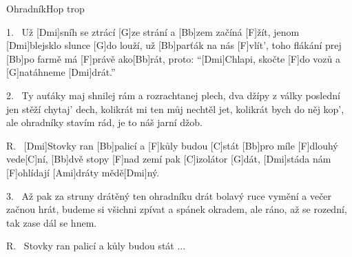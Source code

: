 \begin{song}{Ohradník}{Hop trop}

\begin{xverse}{1.~}
Už [\large Dmi]sníh se ztrácí [\large G]ze strání a [\large Bb]zem začíná [\large F]{žít,}
jenom [\large Dmi]blejsklo slunce [\large G]do louží, už [\large Bb]parťák na nás [\large F]vlít',
toho flákání prej [\large Bb]po farmě má [\large F]právě ako[\large Bb]rát,
proto: ``[\large Dmi]Chlapi, skočte [\large F]do vozů a [\large G]natáhneme [\large Dmi]drát.''
\end{xverse}


\begin{xverse}{2.~}
Ty auťáky maj shnilej rám a rozrachtanej plech,
dva džípy z války poslední jen stěží chytaj' dech,
kolikrát mi ten můj nechtěl jet, kolikrát bych do něj kop',
ale ohradníky stavím rád, je to náš jarní džob.
\end{xverse}


\begin{xverse}{R.~}
[\large Dmi]Stovky ran [\large Bb]palicí a [\large F]kůly budou [\large C]stát
[\large Bb]pro míle [\large F]dlouhý vede[\large C]ní,
[\large Bb]dvě stopy [\large F]nad zemí pak [\large C]izolátor [\large G]dát,
[\large Dmi]stáda nám [\large F]ohlídají [\large Ami]dráty mědě[\large Dmi]ný.
\end{xverse}


\begin{xverse}{3.~}
Až pak za struny drátěný ten ohradníku drát
bolavý ruce vymění a večer začnou hrát,
budeme si všichni zpívat a spánek okradem,
ale ráno, až se rozední, tak zase dál se hnem.
\end{xverse}

\begin{xverse}{R.~}
Stovky ran palicí a kůly budou stát ...
\end{xverse}

\end{song}

